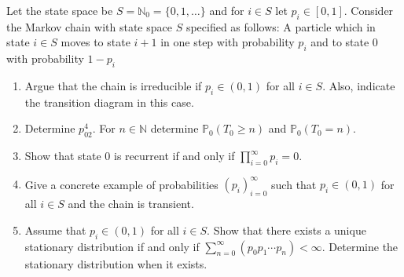\documentclass{Class}
\begin{document}
Let the state space be $S=\mathbb{N}_0=\{0,1, \ldots\}$ and for $i \in S$ let $p_i \in[0,1]$. Consider the Markov chain with state space $S$ specified as follows: A particle which in state $i \in S$ moves to state $i+1$ in one step with probability $p_i$ and to state 0 with probability $1-p_i$
\begin{enumerate}
    \item Argue that the chain is irreducible if $p_i \in(0,1)$ for all $i \in S$. Also, indicate the transition diagram in this case.
    \item Determine $p_{02}^4$. For $n \in \mathbb{N}$ determine $\mathbb{P}_0\left(T_0 \geq n\right)$ and $\mathbb{P}_0\left(T_0=n\right)$.
    \item Show that state 0 is recurrent if and only if $\prod_{i=0}^{\infty} p_i=0$.
    \item Give a concrete example of probabilities $\left(p_i\right)_{i=0}^{\infty}$ such that $p_i \in(0,1)$ for all $i \in S$ and the chain is transient.
    \item Assume that $p_i \in(0,1)$ for all $i \in S$. Show that there exists a unique stationary distribution if and only if $\sum_{n=0}^{\infty}\left(p_0 p_1 \cdots p_n\right)<\infty$. Determine the stationary distribution when it exists.
\end{enumerate}
\solution
\end{document}
